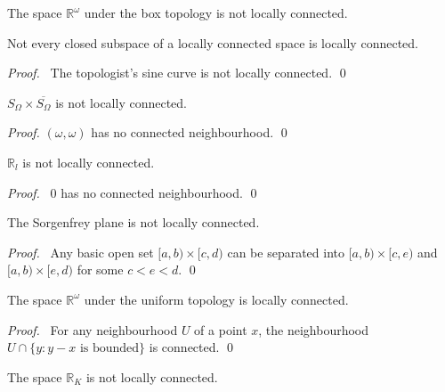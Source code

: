 \begin{cor}
  The space $\mathbb{R}^\omega$ under the box topology is not locally
connected.
\end{cor}

\begin{cor}
Not every closed subspace of a locally connected space is locally connected.
\end{cor}

\begin{proof}
\pf\ The topologist's sine curve is not locally connected. \qed
\end{proof}

 \begin{prop}
 $S_\Omega \times \overline{S_\Omega}$ is not locally connected.
\end{prop}

\begin{proof}
$(\omega, \omega)$ has no connected neighbourhood. \qed
\end{proof}

\begin{prop}
 $\mathbb{R}_l$ is not locally connected.
\end{prop}

\begin{proof}
\pf\ 0 has no connected neighbourhood. \qed
\end{proof}

\begin{prop}
The Sorgenfrey plane is not locally connected.
\end{prop}

\begin{proof}
\pf\ Any basic open set $[a,b) \times [c,d)$ can be separated into $[a,b)
\times [c,e)$ and $[a,b) \times [e,d)$ for some $c < e < d$. \qed
\end{proof}

\begin{prop}
 The space $\mathbb{R}^\omega$ under the uniform topology is locally
connected.
\end{prop}

\begin{proof}
 \pf\ For any neighbourhood $U$ of a point $x$, the neighbourhood $U \cap \{
 y : y - x \text{ is bounded} \}$ is connected. \qed
\end{proof}

\begin{prop}
The space $\mathbb{R}_K$ is not locally connected.
\end{prop}

